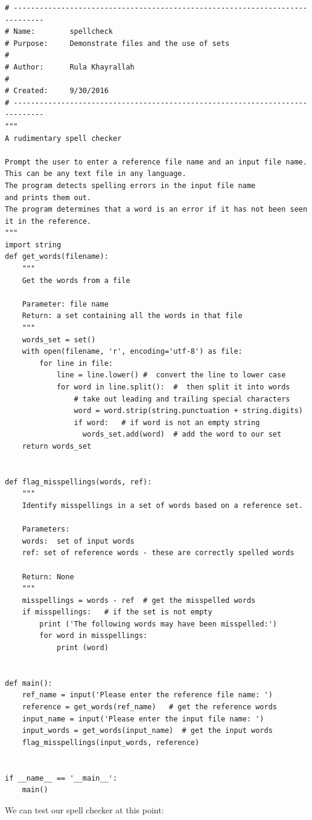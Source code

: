 \documentclass{article}
\begin{document}
\begin{lstlisting}
# -----------------------------------------------------------------------------
# Name:        spellcheck
# Purpose:     Demonstrate files and the use of sets
#
# Author:      Rula Khayrallah
#
# Created:     9/30/2016
# -----------------------------------------------------------------------------
"""
A rudimentary spell checker

Prompt the user to enter a reference file name and an input file name.
This can be any text file in any language.
The program detects spelling errors in the input file name
and prints them out.
The program determines that a word is an error if it has not been seen
it in the reference.
"""
import string
def get_words(filename):
    """
    Get the words from a file

    Parameter: file name
    Return: a set containing all the words in that file
    """
    words_set = set()
    with open(filename, 'r', encoding='utf-8') as file:
        for line in file:
            line = line.lower() #  convert the line to lower case
            for word in line.split():  #  then split it into words
                # take out leading and trailing special characters
                word = word.strip(string.punctuation + string.digits)
                if word:   # if word is not an empty string
                  words_set.add(word)  # add the word to our set
    return words_set


def flag_misspellings(words, ref):
    """
    Identify misspellings in a set of words based on a reference set.

    Parameters: 
    words:  set of input words
    ref: set of reference words - these are correctly spelled words

    Return: None
    """
    misspellings = words - ref  # get the misspelled words
    if misspellings:   # if the set is not empty
        print ('The following words may have been misspelled:')
        for word in misspellings:
            print (word)


def main():
    ref_name = input('Please enter the reference file name: ')
    reference = get_words(ref_name)   # get the reference words
    input_name = input('Please enter the input file name: ')
    input_words = get_words(input_name)  # get the input words
    flag_misspellings(input_words, reference)


if __name__ == '__main__':
    main()
\end{lstlisting}

We can test our spell checker at this point:
\end{document}
